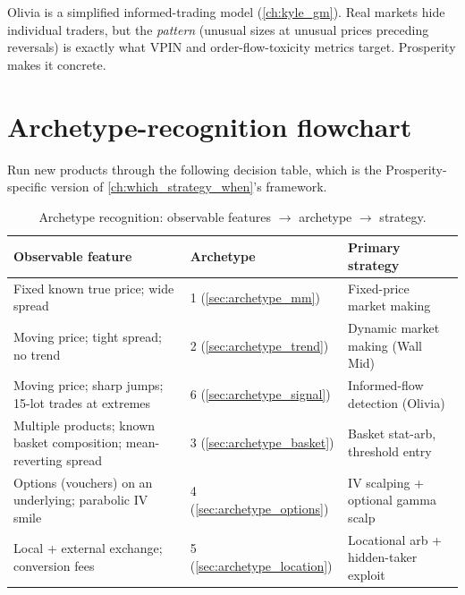 \begin{intuitionbox}
Olivia is a simplified informed-trading model
(\cref{ch:kyle_gm}).  Real markets hide individual traders, but
the \emph{pattern} (unusual sizes at unusual prices preceding
reversals) is exactly what VPIN and order-flow-toxicity metrics
target.  Prosperity makes it concrete.
\end{intuitionbox}

\section{Archetype-recognition flowchart}
\label{sec:archetype_flowchart}

Run new products through the following decision table, which is the
Prosperity-specific version of \cref{ch:which_strategy_when}'s
framework.

\begin{table}[htbp]
\centering
\small
\caption{Archetype recognition: observable features $\to$ archetype
  $\to$ strategy.}
\label{tab:archetype_recognition}
\begin{tabular}{@{}p{4.2cm}lp{4.5cm}@{}}
\toprule
\textbf{Observable feature} & \textbf{Archetype} &
\textbf{Primary strategy} \\
\midrule
Fixed known true price; wide spread &
1 (\cref{sec:archetype_mm}) &
Fixed-price market making \\
\addlinespace
Moving price; tight spread; no trend &
2 (\cref{sec:archetype_trend}) &
Dynamic market making (Wall Mid) \\
\addlinespace
Moving price; sharp jumps; 15-lot trades at extremes &
6 (\cref{sec:archetype_signal}) &
Informed-flow detection (Olivia) \\
\addlinespace
Multiple products; known basket composition; mean-reverting spread &
3 (\cref{sec:archetype_basket}) &
Basket stat-arb, threshold entry \\
\addlinespace
Options (vouchers) on an underlying; parabolic IV smile &
4 (\cref{sec:archetype_options}) &
IV scalping + optional gamma scalp \\
\addlinespace
Local + external exchange; conversion fees &
5 (\cref{sec:archetype_location}) &
Locational arb + hidden-taker exploit \\
\bottomrule
\end{tabular}
\end{table}

